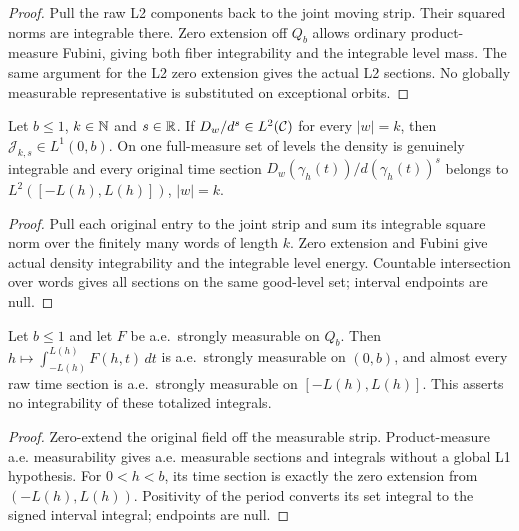 \begin{proof}
\leanok
Pull the raw L2 components back to the joint moving strip.
Their squared norms are integrable there.
Zero extension off $Q_b$ allows ordinary product-measure Fubini,
giving both fiber integrability and the integrable level mass.
The same argument for the L2 zero extension gives the actual L2
sections. No globally measurable representative is substituted
on exceptional orbits.
\end{proof}

\begin{lemma}
\label{lem:quarter-jet-energy}
\leanok
Let $b\le1$, $k\in\mathbb{N}$ and $s\in\mathbb{R}$.
If $D_w/d^s\in L^2(\mathcal{C})$ for every $|w|=k$, then
$\mathcal J_{k,s}\in L^1(0,b)$.
On one full-measure set of levels the density is genuinely integrable
and every original time section
$D_w(\gamma_h(t))/d(\gamma_h(t))^s$ belongs to
$L^2([-L(h),L(h)])$, $|w|=k$.
\end{lemma}

\begin{proof}
\leanok
Pull each original entry to the joint strip and sum its integrable
square norm over the finitely many words of length $k$.
Zero extension and Fubini give actual density integrability and the
integrable level energy. Countable intersection over words gives all
sections on the same good-level set; interval endpoints are null.
\end{proof}

\begin{lemma}
\label{lem:quarter-strip-measurable-integrals}
\leanok
Let $b\le1$ and let $F$ be a.e.\ strongly measurable on $Q_b$.
Then $h\mapsto\int_{-L(h)}^{L(h)}F(h,t)\,dt$ is a.e.\ strongly measurable
on $(0,b)$, and almost every raw time section is a.e.\ strongly measurable
on $[-L(h),L(h)]$.
This asserts no integrability of these totalized integrals.
\end{lemma}

\begin{proof}
\leanok
Zero-extend the original field off the measurable strip.
Product-measure a.e. measurability gives a.e. measurable sections and
integrals without a global L1 hypothesis.
For $0<h<b$, its time section is exactly the zero extension from
$(-L(h),L(h))$. Positivity of the period converts its set integral
to the signed interval integral; endpoints are null.
\end{proof}

